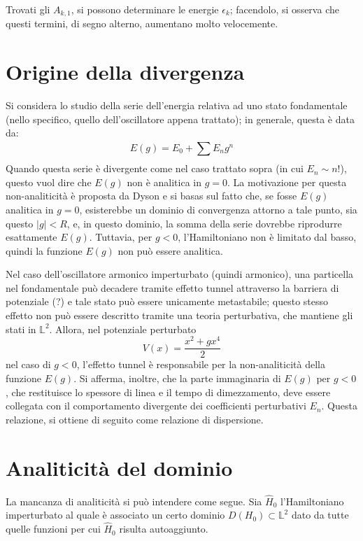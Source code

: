 \documentclass[11pt, a4paper]{scrartcl} %
\numberwithin{equation}{section}
\theoremstyle{style2}
\theoremstyle{style1}
\begin{document}
Trovati gli $A_{k,1} $, si possono determinare le energie $\epsilon _k$; facendolo, si osserva che questi termini, di segno alterno, aumentano molto velocemente.

\section{Origine della divergenza}
Si considera lo studio della serie dell'energia relativa ad uno stato fondamentale (nello specifico, quello dell'oscillatore appena trattato); in generale, questa \`e data da:
\begin{equation}
	E(g) = E_0 + \sum_{}^{} E_n g^n
\end{equation}
Quando questa serie \`e divergente come nel caso trattato sopra (in cui $E_n \sim n!$), questo vuol dire che $E(g)$ non \`e analitica in $g=0$.
La motivazione per questa non-analiticit\`a \`e proposta da Dyson e si basas sul fatto che, se fosse $E(g)$ analitica in $g=0$, esisterebbe un dominio di convergenza attorno a tale punto, sia questo $\lvert g \rvert < R$, e, in questo dominio, la somma della serie dovrebbe riprodurre esattamente $E(g)$.
Tuttavia, per $g<0$, l'Hamiltoniano non \`e limitato dal basso, quindi la funzione $E(g)$ non pu\`o essere analitica. 

Nel caso dell'oscillatore armonico imperturbato (quindi armonico), {\color{red}una particella nel fondamentale pu\`o decadere tramite effetto tunnel attraverso la barriera di potenziale (?)} e tale stato pu\`o essere unicamente metastabile; questo stesso effetto non pu\`o essere descritto tramite una teoria perturbativa, che mantiene gli stati in $\mathbb{L}^2$. 
Allora, nel potenziale perturbato
\[
V(x) = \frac{x^2 + gx^4 }{2}
\] 
nel caso di $g< 0$, l'effetto tunnel \`e responsabile per la non-analiticit\`a della funzione $E(g)$.
Si afferma, inoltre, che la parte immaginaria di $E(g)$ per $g<0$, che restituisce lo spessore di linea e il tempo di dimezzamento, deve essere collegata con il comportamento divergente dei coefficienti perturbativi $E_n$.
Questa relazione, si ottiene di seguito come relazione di dispersione.
\section{Analiticit\`a del dominio}
La mancanza di analiticit\`a si pu\`o intendere come segue.
Sia $\hat{H}_0$ l'Hamiltoniano imperturbato al quale \`e associato un certo dominio $D(H_0)\subset \mathbb{L}^2$ dato da tutte quelle funzioni per cui $\hat{H}_0$ risulta autoaggiunto.
\end{document}
